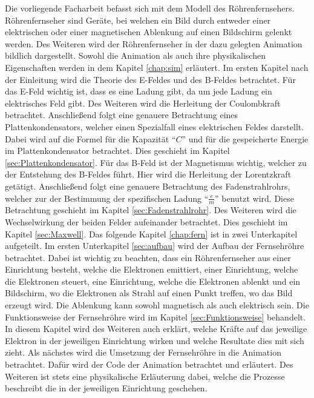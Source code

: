 Die vorliegende Facharbeit befasst sich mit dem Modell des Röhrenfernsehers.
Röhrenfernseher sind Geräte, bei welchen ein Bild durch entweder einer elektrischen oder einer magnetischen Ablenkung auf einen Bildschirm gelenkt werden.
Des Weiteren wird der Röhrenfernseher in der dazu gelegten Animation bildlich dargestellt.
Sowohl die Animation als auch ihre physikalischen Eigenschaften werden in dem Kapitel \ref{chap:sim} erläutert.
Im ersten Kapitel nach der Einleitung wird die Theorie des E-Feldes und des B-Feldes betrachtet.
Für das E-Feld wichtig ist, dass es eine Ladung gibt, da um jede Ladung ein elektrisches Feld gibt.
Des Weiteren wird die Herleitung der Coulombkraft betrachtet.
Anschließend folgt eine genauere Betrachtung eines Plattenkondensators, welcher einen Spezialfall eines elektrischen Feldes darstellt.
Dabei wird auf die Formel für die Kapazität "`$C$"' und für die gespeicherte Energie im Plattenkondensator betrachtet.
Dies geschieht im Kapitel \ref{sec:Plattenkondensator}.
Für das B-Feld ist der Magnetismus wichtig, welcher zu der Entstehung des B-Feldes führt.
Hier wird die Herleitung der Lorentzkraft getätigt.
Anschließend folgt eine genauere Betrachtung des Fadenstrahlrohrs, welcher zur der Bestimmung der spezifischen Ladung "`$\frac{e}{m}$"' benutzt wird.
Diese Betrachtung geschieht im Kapitel \ref{sec:Fadenstrahlrohr}.
Des Weiteren wird die Wechselwirkung der beiden Felder aufeinander betrachtet.
Dies geschieht im Kapitel \ref{sec:Maxwell}.
Das folgende Kapitel \ref{chap:fern} ist in zwei Unterkapitel aufgeteilt.
Im ersten Unterkapitel \ref{sec:aufbau} wird der Aufbau der Fernsehröhre betrachtet.
Dabei ist wichtig zu beachten, dass ein Röhrenfernseher aus einer Einrichtung besteht, welche die Elektronen emittiert, einer Einrichtung, welche die Elektronen steuert, eine Einrichtung, welche die Elektronen ablenkt und ein Bildschirm, wo die Elektronen als Strahl auf einen Punkt treffen, wo das Bild erzeugt wird.
Die Ablenkung kann sowohl magnetisch als auch elektrisch sein.
Die Funktionsweise der Fernsehröhre wird im Kapitel \ref{sec:Funktionsweise} behandelt.
In diesem Kapitel wird des Weiteren auch erklärt, welche Kräfte auf das jeweilige Elektron in der jeweiligen Einrichtung wirken und welche Resultate dies mit sich zieht.
Als nächstes wird die Umsetzung der Fernsehröhre in die Animation betrachtet.
Dafür wird der Code der Animation betrachtet und erläutert.
Des Weiteren ist stets eine physikalische Erläuterung dabei, welche die Prozesse beschreibt die in der jeweiligen Einrichtung geschehen.
